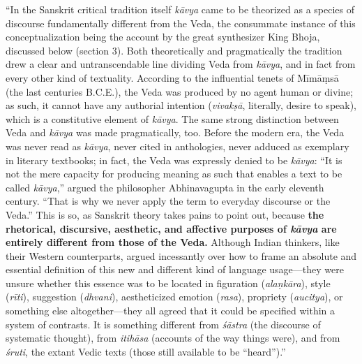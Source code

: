 \begin{myquote}
“In the Sanskrit critical tradition itself \textit{kāvya} came to be theorized as a species of discourse fundamentally different from the Veda, the consummate instance of this conceptualization being the account by the great synthesizer King Bhoja, discussed below (section 3). Both theoretically and pragmatically the tradition drew a clear and untranscendable line dividing Veda from \textit{kāvya}, and in fact from every other kind of textuality. According to the influential tenets of Mīmāṃsā (the last centuries B.C.E.), the Veda was produced by no agent human or divine; as such, it cannot have any authorial intention (\textit{vivakṣā}, literally, desire to speak), which is a constitutive element of \textit{kāvya}. The same strong distinction between Veda and \textit{kāvya} was made pragmatically, too. Before the modern era, the Veda was never read as \textit{kāvya}, never cited in anthologies, never adduced as exemplary in literary textbooks; in fact, the Veda was expressly denied to be \textit{kāvya}: “It is not the mere capacity for producing meaning as such that enables a text to be called \textit{kāvya},” argued the philosopher Abhinavagupta in the early eleventh century. “That is why we never apply the term to everyday discourse or the Veda.” This is so, as Sanskrit theory takes pains to point out, because \textbf{the rhetorical, discursive, aesthetic, and affective purposes of \textit{kāvya} are entirely different from those of the Veda.} Although Indian thinkers, like their Western counterparts, argued incessantly over how to frame an absolute and essential definition of this new and different kind of language usage—they were unsure whether this essence was to be located in figuration (\textit{alaṇkāra}), style (\textit{rīti}), suggestion (\textit{dhvani}), aestheticized emotion (\textit{rasa}), propriety (\textit{aucitya}), or something else altogether—they all agreed that it could be specified within a system of contrasts. It is something different from \textit{śāstra} (the discourse of systematic thought), from \textit{itihāsa} (accounts of the way things were), and from \textit{śruti}, the extant Vedic texts (those still available to be “heard”).”
\end{myquote}


